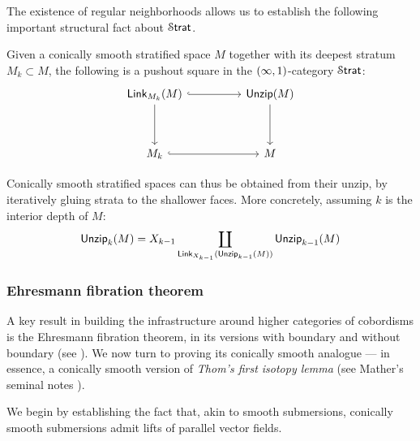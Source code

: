 The existence of regular neighborhoods allows us to establish the following important structural fact about $\operatorname{\mathcal S\mathsf{trat}}$.

\begin{proposition}\cite[Lemma~2.5.2]{AFR1}
    Given a conically smooth stratified space $M$ together with its deepest stratum $M_k \subset M$, the following is a pushout square in the $(\operatorname{\infty},1)$-category $\operatorname{\mathcal S\mathsf{trat}}$:
    \begin{equation}
        \begin{tikzcd}[ampersand replacement=\&]
            {\link_{M_{k}}(M)} \&\& {\unzip(M)} \\
            \\
            {M_k} \&\& M
            \arrow[hook, from=1-1, to=1-3]
            \arrow[from=1-1, to=3-1]
            \arrow[from=1-3, to=3-3]
            \arrow[hook, from=3-1, to=3-3]
        \end{tikzcd}
    \end{equation} 
\end{proposition}

Conically smooth stratified spaces can thus be obtained from their unzip, by iteratively gluing strata to the shallower faces. More concretely, assuming $k$ is the interior depth of $M$:
\begin{equation}
    \operatorname{\sf Unzip}_{k}(M) = X_{k-1} \coprod_{\operatorname{{\sf Link}}_{X_{k-1}}(\operatorname{\sf Unzip}_{k-1}(M))} \operatorname{\sf Unzip}_{k-1}(M)
\end{equation}

\subsubsection{Ehresmann fibration theorem}
A key result in building the infrastructure around higher categories of cobordisms is the Ehresmann fibration theorem, in its versions with boundary and without boundary (see ). We now turn to proving its conically smooth analogue — in essence, a conically smooth version of \emph{Thom's first isotopy lemma} (see Mather's seminal notes \cite[Proposition~11.1]{Mat70}). 

We begin by establishing the fact that, akin to smooth submersions, conically smooth submersions admit lifts of parallel vector fields.

